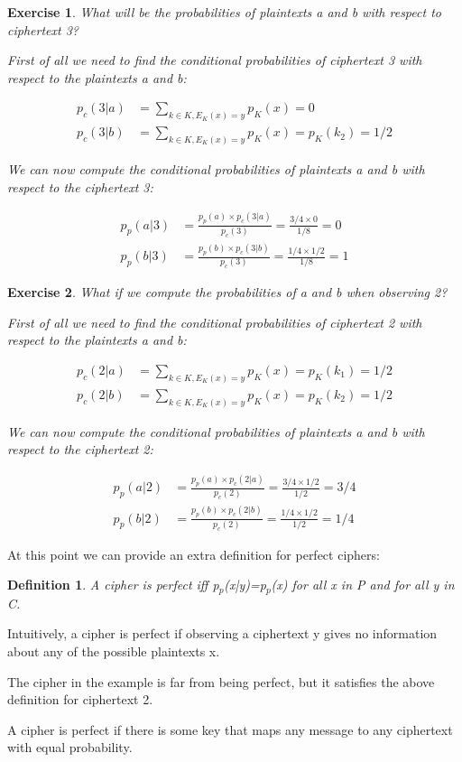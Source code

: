 \documentclass[a4paper, 12pt]{report}
\newtheorem{definition}{\textbf{Definition}}
\newtheorem{exercise}{\textbf{Exercise}}
\begin{document}
\begin{exercise}
	What will be the probabilities of plaintexts a and b with respect to ciphertext 3?
	
	First of all we need to find the conditional probabilities of ciphertext 3 with respect to the plaintexts a and b:
	
	\setcounter{equation}{0}
	\begin{align}
		p_c(3|a) &= \sum_{k\in K, E_K(x)=y}^{} p_K(x) = 0 \\
		p_c(3|b) &= \sum_{k\in K, E_K(x)=y}^{} p_K(x) = p_K(k_2) = 1/2		
	\end{align}
	
	We can now compute the conditional probabilities of plaintexts a and b with respect to the ciphertext 3:
	
	\setcounter{equation}{0}
	\begin{align}
		p_p(a|3) &= \frac{p_p(a) \times p_c(3|a)}{p_c(3)} = \frac{3/4 \times 0}{1/8} = 0\\
		p_p(b|3) &= \frac{p_p(b) \times p_c(3|b)}{p_c(3)} = \frac{1/4 \times 1/2}{1/8} =  1
	\end{align}
\end{exercise}

\begin{exercise}
	What if we compute the probabilities of a and b when observing 2?
	
	First of all we need to find the conditional probabilities of ciphertext 2 with respect to the plaintexts a and b:
	
	\setcounter{equation}{0}
	\begin{align}
	p_c(2|a) &= \sum_{k\in K, E_K(x)=y}^{} p_K(x) = p_K(k_1) = 1/2 \\
	p_c(2|b) &= \sum_{k\in K, E_K(x)=y}^{} p_K(x) = p_K(k_2) = 1/2		
	\end{align}
	
	We can now compute the conditional probabilities of plaintexts a and b with respect to the ciphertext 2:
	
	\setcounter{equation}{0}
	\begin{align}
	p_p(a|2) &= \frac{p_p(a) \times p_c(2|a)}{p_c(2)} = \frac{3/4 \times 1/2}{1/2} = 3/4\\
	p_p(b|2) &= \frac{p_p(b) \times p_c(2|b)}{p_c(2)} = \frac{1/4 \times 1/2}{1/2} =  1/4
	\end{align}
\end{exercise}

At this point we can provide an extra definition for perfect ciphers:
\begin{definition}
	A cipher is perfect iff p$_p$(x|y)=p$_p$(x) for all x in P and for all y in C.
\end{definition}

Intuitively, a cipher is perfect if observing a ciphertext y gives no information about any of the possible plaintexts x.

The cipher in the example is far from being perfect, but it satisfies the above definition for ciphertext 2.

A cipher is perfect if there is some key that maps any message to any ciphertext with equal probability.
\end{document}
